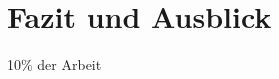 \documentclass[12pt,oneside]{article}
\begin{document}
\section{Fazit und Ausblick}

10\% der Arbeit

\clearpage
\lhead{}
\printbibliography
{}



\newpage
\end{document}
